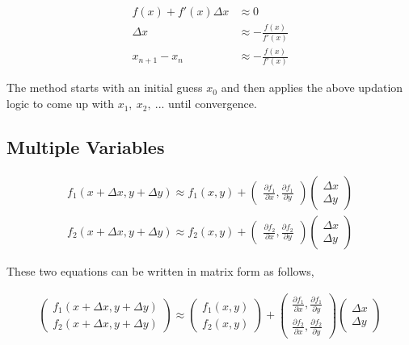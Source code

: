 \documentclass[11pt, a4paper]{article}
\begin{document}
\begin{align*}
	f(x) + f'(x) \Delta x &\approx 0  \\
	\Delta x &\approx - \frac{f(x)}{f'(x)} \\
	x_{n+1} - x_{n} &\approx - \frac{f(x)}{f'(x)}
\end{align*}

The method starts with an initial guess $x_0$ and then applies the above updation logic to come up with $x_1,\ x_2,\ ...$ until convergence.

\subsection{Multiple Variables}

\begin{align*}
	f_1(x+\Delta x, y+\Delta y) \approx f_1(x, y) + \begin{pmatrix} \frac{\partial f_1}{\partial x}, \frac{\partial f_1}{\partial y} \end{pmatrix} \begin{pmatrix} \Delta x \\ \Delta y \end{pmatrix} \\
	f_2(x+\Delta x, y+\Delta y) \approx f_2(x, y) + \begin{pmatrix} \frac{\partial f_2}{\partial x}, \frac{\partial f_2}{\partial y} \end{pmatrix} \begin{pmatrix} \Delta x \\ \Delta y \end{pmatrix} 	
\end{align*}

These two equations can be written in matrix form as follows,

\begin{align*}
\begin{pmatrix} f_1(x+\Delta x, y+\Delta y) \\ f_2(x+\Delta x, y+\Delta y)\end{pmatrix} \approx \begin{pmatrix} f_1(x, y) \\ f_2(x, y) \end{pmatrix} + \begin{pmatrix} \frac{\partial f_1}{\partial x}, \frac{\partial f_1}{\partial y} \\ \frac{\partial f_2}{\partial x}, \frac{\partial f_2}{\partial y}\end{pmatrix} \begin{pmatrix} \Delta x \\ \Delta y \end{pmatrix} 
\end{align*}
\end{document}
